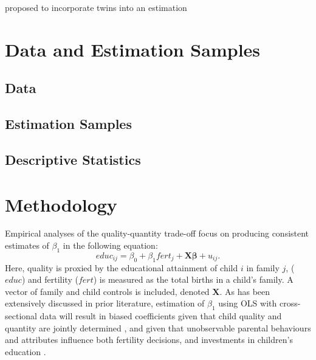 \documentclass[subeqn]{article}
\begin{document}
\begin{spacing}{1.4}
\citet{RosenzweigWolpin1980} proposed to incorporate twins into an estimation



\section{Data and Estimation Samples}              \label{TWINscn:data}
\subsection{Data}                                  \label{TWINsscn:data}
\subsection{Estimation Samples}                    \label{TWINsscn:samples}
\subsection{Descriptive Statistics}                \label{TWINsscn:descriptives}



\section{Methodology}                              \label{TWINscn:method}
Empirical analyses of the quality-quantity trade-off focus on producing 
consistent estimates of $\beta_1$ in the following equation:
\begin{equation}
\label{TWINeqn:RF}
educ_{ij}=\beta_0+\beta_1 fert_{j} + \bm{X}\bm{\beta}+u_{ij}.
\end{equation}
Here, quality is proxied by the educational attainment of child $i$ in family 
$j$, ($educ$) and fertility ($fert$) is measured as the total births in a child's
family.  A vector of family and child controls is included, denoted $\bm{X}$.  As
has been extensively discussed in prior literature, estimation of $\beta_1$ using
OLS with cross-sectional data will result in biased coefficients given that child 
quality and quantity are jointly determined \citep{BeckerLewis1973,
BeckerTomes1976}, and given that unobservable parental behaviours and attributes 
influence both fertility decisions, and investments in children's education 
\citep{Qian2009}.


\end{spacing}
\end{document}
